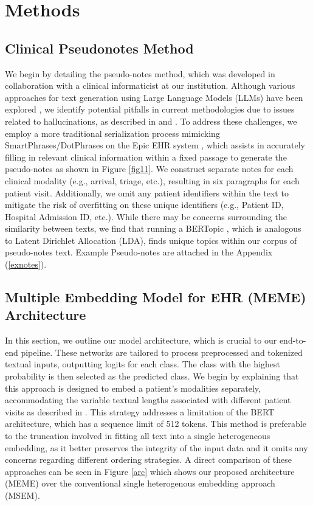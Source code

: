 \documentclass{article}
\theoremstyle{plain}
\theoremstyle{definition}
\theoremstyle{remark}
\begin{document}
\section{Methods}

\subsection{Clinical Pseudonotes Method}
\label{notes}

We begin by detailing the pseudo-notes method, which was developed in collaboration with a clinical informaticist at our institution. Although various approaches for text generation using Large Language Models (LLMs) have been explored \citep{hegselmann2024data} \citep{ellershaw2024automated}, we identify potential pitfalls in current methodologies due to issues related to hallucinations, as described in \citep{hegselmann2024data} and \citep{lee2024large}. To address these challenges, we employ a more traditional serialization process mimicking SmartPhrases/DotPhrases on the Epic
EHR system \citep{chang2021emr}, which assists in accurately filling in relevant clinical information within a fixed passage to generate the pseudo-notes as shown in Figure \ref{fig11}. We construct separate notes for each clinical modality (e.g., arrival, triage, etc.), resulting in six paragraphs for each patient visit. Additionally, we omit any patient identifiers within the text to mitigate the risk of overfitting on these unique identifiers (e.g., Patient ID, Hospital Admission ID, etc.). While there may be concerns surrounding the similarity between texts, we find that running a BERTopic \citep{grootendorst2022bertopic}, which is analogous to Latent Dirichlet Allocation (LDA), finds unique topics within our corpus of pseudo-notes text. Example Pseudo-notes are attached in the Appendix (\ref{exnotes}).

\subsection{Multiple Embedding Model for EHR (MEME) Architecture}
In this section, we outline our model architecture, which is crucial to our end-to-end pipeline. These networks are tailored to process preprocessed and tokenized textual inputs, outputting logits for each class. The class with the highest probability is then selected as the predicted class. We begin by explaining that this approach is designed to embed a patient's modalities separately, accommodating the variable textual lengths associated with different patient visits as described in \citep{rupp_exbehrt_2023}. This strategy addresses a limitation of the BERT architecture, which has a sequence limit of 512 tokens. This method is preferable to the truncation involved in fitting all text into a single heterogeneous embedding, as it better preserves the integrity of the input data and it omits any concerns regarding different ordering strategies. A direct comparison of these approaches can be seen in Figure \ref{arc} which shows our proposed architecture (MEME) over the conventional single heterogenous embedding approach (MSEM).
\end{document}
